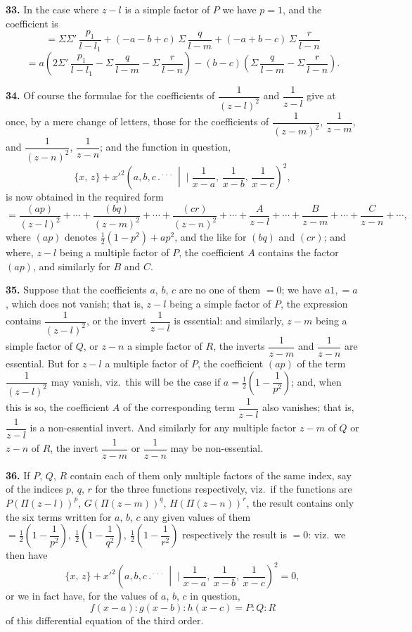 \documentclass[11pt]{article}
\newcommand{\artno}[1]{\textbf{#1.}\quad}
\begin{document}
\artno{33} In the case where $z-l$ is a simple factor of $P$ we have $p=1$, and the
coefficient is
\[
   = \Sigma\Sigma'\,\frac{p_{1}}{l-l_{1}} + (-a-b+c)\,\Sigma\,\frac{q}{l-m} + (-a+b-c)\,\Sigma\,\frac{r}{l-n}
\]
\[
   = a\!\left(2\Sigma'\,\frac{p_{1}}{l-l_{1}} - \Sigma\,\frac{q}{l-m} - \Sigma\,\frac{r}{l-n}\right) - (b-c)\!\left(\Sigma\,\frac{q}{l-m} - \Sigma\,\frac{r}{l-n}\right).
\]

\newpage
\artno{34} Of course the formulae for the coefficients of $\dfrac{1}{(z-l)^{2}}$ and $\dfrac{1}{z-l}$ give at once,
by a mere change of letters, those for the coefficients of $\dfrac{1}{(z-m)^{2}}$, $\dfrac{1}{z-m}$, and
$\dfrac{1}{(z-n)^{2}}$, $\dfrac{1}{z-n}$; and the function in question,
\[
   \{x,\,z\} + x'^{2}\!\left(a, b, c \,.{}^{\!\cdot\!\cdot\!\cdot}\,\middle|\!\!\!\mid \frac{1}{x-a},\,\frac{1}{x-b},\,\frac{1}{x-c}\right)^{\!2},
\]
is now obtained in the required form
\[
   = \frac{(ap)}{(z-l)^{2}} + \cdots + \frac{(bq)}{(z-m)^{2}} + \cdots + \frac{(cr)}{(z-n)^{2}} + \cdots + \frac{A}{z-l} + \cdots + \frac{B}{z-m} + \cdots + \frac{C}{z-n} + \cdots,
\]
where $(ap)$ denotes $\tfrac{1}{2}(1 - p^{2}) + ap^{2}$, and the like for $(bq)$ and $(cr)$; and where, $z-l$
being a multiple factor of $P$, the coefficient $A$ contains the factor $(ap)$, and similarly
for $B$ and $C$.

\artno{35} Suppose that the coefficients $a$, $b$, $c$ are no one of them $=0$; we have
$a1, =a$, which does not vanish; that is, $z-l$ being a simple factor of $P$, the
expression contains $\dfrac{1}{(z-l)^{2}}$, or the invert $\dfrac{1}{z-l}$ is essential: and similarly, $z-m$ being
a simple factor of $Q$, or $z-n$ a simple factor of $R$, the inverts $\dfrac{1}{z-m}$ and $\dfrac{1}{z-n}$
are essential. But for $z-l$ a multiple factor of $P$, the coefficient $(ap)$ of the term $\dfrac{1}{(z-l)^{2}}$
may vanish, viz.\ this will be the case if $a = \tfrac{1}{2}\!\left(1 - \dfrac{1}{p^{2}}\right)$; and, when this is so, the
coefficient $A$ of the corresponding term $\dfrac{1}{z-l}$ also vanishes; that is, $\dfrac{1}{z-l}$ is a non-essential invert. And similarly for any multiple factor $z-m$ of $Q$ or $z-n$ of $R$, the
invert $\dfrac{1}{z-m}$ or $\dfrac{1}{z-n}$ may be non-essential.

\artno{36} If $P$, $Q$, $R$ contain each of them only multiple factors of the same index,
say of the indices $p$, $q$, $r$ for the three functions respectively, viz.\ if the functions
are $P(\Pi(z-l))^{p}$, $G(\Pi(z-m))^{q}$, $H(\Pi(z-n))^{r}$, the result contains only the six terms
written for $a$, $b$, $c$ any given values of them $=\tfrac{1}{2}\!\left(1 - \dfrac{1}{p^{2}}\right),\ \tfrac{1}{2}\!\left(1 - \dfrac{1}{q^{2}}\right),\ \tfrac{1}{2}\!\left(1 - \dfrac{1}{r^{2}}\right)$ respectively
the result is $=0$: viz.\ we then have
\[
   \{x,\,z\} + x'^{2}\!\left(a, b, c \,.{}^{\!\cdot\!\cdot\!\cdot}\,\middle|\!\!\!\mid \frac{1}{x-a},\,\frac{1}{x-b},\,\frac{1}{x-c}\right)^{\!2} = 0,
\]
or we in fact have, for the values of $a$, $b$, $c$ in question,
\[
   f(x-a) : g(x-b) : h(x-c) = P : Q : R
\]
of this differential equation of the third order.
\end{document}
